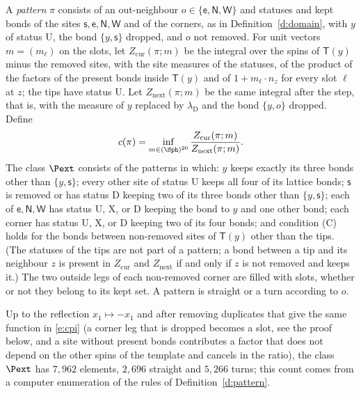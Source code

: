 \begin{definition}\label{d:pattern}
A \emph{pattern} $\pi$ consists of an out-neighbour $o \in \{\mathsf e, \mathsf N, \mathsf W\}$ and statuses and kept bonds of the sites $\mathsf s, \mathsf e, \mathsf N, \mathsf W$ and of the corners, as in Definition~\ref{d:domain}, with $y$ of status $\mathrm U$, the bond $\{y, \mathsf s\}$ dropped, and $o$ not removed. For unit vectors $m = (m_\ell)$ on the slots, let $Z_{\mathrm{cur}}(\pi; m)$ be the integral over the spins of $\mathsf T(y)$ minus the removed sites, with the site measures of the statuses, of the product of the factors of the present bonds inside $\mathsf T(y)$ and of $1 + m_\ell \cdot n_z$ for every slot $\ell$ at $z$; the tips have status $\mathrm U$. Let $Z_{\mathrm{next}}(\pi; m)$ be the same integral after the step, that is, with the measure of $y$ replaced by $\lambda_{\mathrm D}$ and the bond $\{y, o\}$ dropped. Define
\begin{equation}\label{e:cpi}
c(\pi) = \inf_{m \in (\Sph)^{20}} \frac{Z_{\mathrm{cur}}(\pi; m)}{Z_{\mathrm{next}}(\pi; m)} .
\end{equation}
The class $\Pext$ consists of the patterns in which: $y$ keeps exactly its three bonds other than $\{y,\mathsf s\}$; every other site of status $\mathrm U$ keeps all four of its lattice bonds; $\mathsf s$ is removed or has status $\mathrm D$ keeping two of its three bonds other than $\{y, \mathsf s\}$; each of $\mathsf e, \mathsf N, \mathsf W$ has status $\mathrm U$, $\mathrm X$, or $\mathrm D$ keeping the bond to $y$ and one other bond; each corner has status $\mathrm U$, $\mathrm X$, or $\mathrm D$ keeping two of its four bonds; and condition (C) holds for the bonds between non-removed sites of $\mathsf T(y)$ other than the tips. (The statuses of the tips are not part of a pattern; a bond between a tip and its neighbour $z$ is present in $Z_{\mathrm{cur}}$ and $Z_{\mathrm{next}}$ if and only if $z$ is not removed and keeps it.) The two outside legs of each non-removed corner are filled with slots, whether or not they belong to its kept set. A pattern is straight or a turn according to $o$.
\end{definition}

Up to the reflection $x_1 \mapsto -x_1$ and after removing duplicates that give the same function in \eqref{e:cpi} (a corner leg that is dropped becomes a slot, see the proof below, and a site without present bonds contributes a factor that does not depend on the other spins of the template and cancels in the ratio), the class $\Pext$ has $7{, }962$ elements, $2{, }696$ straight and $5{, }266$ turns; this count comes from a computer enumeration of the rules of Definition~\ref{d:pattern}.

